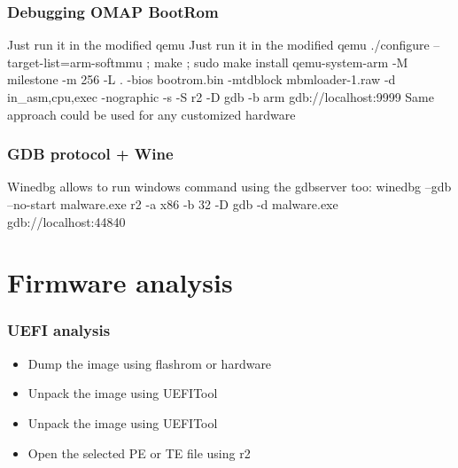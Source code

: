 \documentclass[10pt,pdf,utf8,english,compress,hyperref={unicode}]{beamer}
\begin{document}
\begin{frame}[fragile]
  \frametitle{Debugging OMAP BootRom}
\ifxetex
  \center Just run it in the modified qemu
\else
  \center Just run it in the modified qemu 
\fi
  \center ./configure --target-list=arm-softmmu ; make ; sudo make install
  \center qemu-system-arm -M milestone -m 256 -L . -bios bootrom.bin -mtdblock	mbmloader-1.raw -d in\_asm,cpu,exec -nographic -s -S
  \center r2 -D gdb -b arm gdb://localhost:9999
  \center Same approach could be used for any customized hardware
\end{frame}


\begin{frame}[fragile]
  \frametitle{GDB protocol + Wine}
  \center Winedbg allows to run windows command
  \center using the gdbserver too:
  \center winedbg --gdb --no-start malware.exe
  \center r2 -a x86 -b 32 -D gdb -d malware.exe gdb://localhost:44840
\end{frame}

\section{Firmware analysis}
\begin{frame}[fragile]
  \frametitle{UEFI analysis}
  \begin{itemize}
    \item Dump the image using flashrom or hardware
\ifxetex
	\item Unpack the image using UEFITool
\else
	\item Unpack the image using UEFITool 
\fi
	\item Open the selected PE or TE file using r2
  \end{itemize}
\end{frame}

\end{document}
